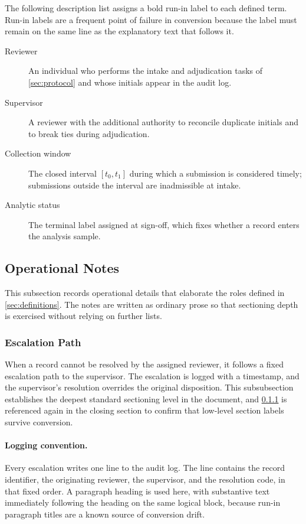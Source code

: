 \documentclass[11pt]{article}
\begin{document}
The following description list assigns a bold run-in label to each defined term.
Run-in labels are a frequent point of failure in conversion because the label
must remain on the same line as the explanatory text that follows it.

\begin{description}
\item[Reviewer] An individual who performs the intake and adjudication tasks of
  \cref{sec:protocol} and whose initials appear in the audit log.
\item[Supervisor] A reviewer with the additional authority to reconcile
  duplicate initials and to break ties during adjudication.
\item[Collection window] The closed interval $[t_0, t_1]$ during which a
  submission is considered timely; submissions outside the interval are
  inadmissible at intake.
\item[Analytic status] The terminal label assigned at sign-off, which fixes
  whether a record enters the analysis sample.
\end{description}

\subsection{Operational Notes}
\label{sec:opnotes}

This subsection records operational details that elaborate the roles defined in
\cref{sec:definitions}. The notes are written as ordinary prose so that
sectioning depth is exercised without relying on further lists.

\subsubsection{Escalation Path}
\label{sec:escalation}

When a record cannot be resolved by the assigned reviewer, it follows a fixed
escalation path to the supervisor. The escalation is logged with a timestamp,
and the supervisor's resolution overrides the original disposition. This
subsubsection establishes the deepest standard sectioning level in the document,
and \cref{sec:escalation} is referenced again in the closing section to confirm
that low-level section labels survive conversion.

\paragraph{Logging convention.}
Every escalation writes one line to the audit log. The line contains the record
identifier, the originating reviewer, the supervisor, and the resolution code,
in that fixed order. A paragraph heading is used here, with substantive text
immediately following the heading on the same logical block, because run-in
paragraph titles are a known source of conversion drift.
\end{document}
